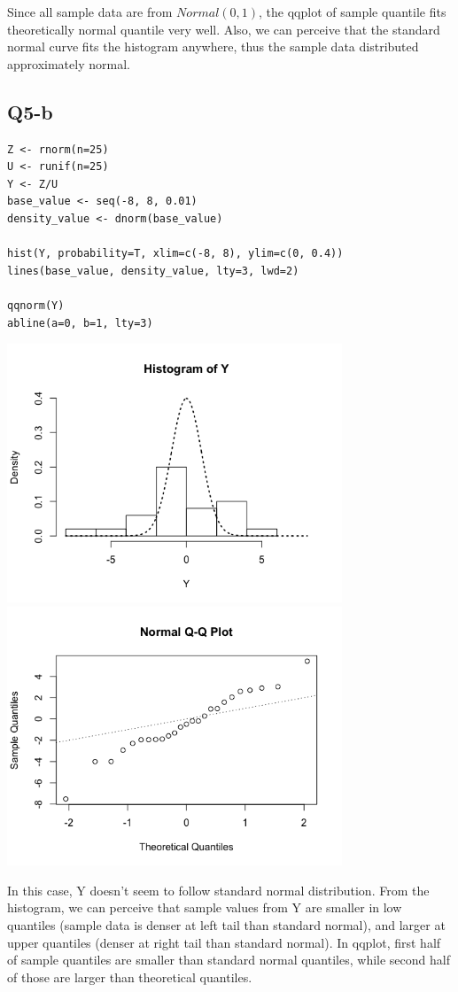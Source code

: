 \documentclass[11pt,letterpaper]{article}
\begin{document}
\noindent Since all sample data are from $Normal(0,1)$, the qqplot of sample quantile fits theoretically normal quantile very well. Also, we can perceive that the standard normal curve fits the histogram anywhere, thus the sample data distributed approximately normal. 

\newpage
\subsection*{Q5-b}
\begin{verbatim}
Z <- rnorm(n=25)
U <- runif(n=25)
Y <- Z/U
base_value <- seq(-8, 8, 0.01) 
density_value <- dnorm(base_value)

hist(Y, probability=T, xlim=c(-8, 8), ylim=c(0, 0.4))
lines(base_value, density_value, lty=3, lwd=2)

qqnorm(Y)
abline(a=0, b=1, lty=3)
\end{verbatim}

\hspace*{-1 in} 
\includegraphics[width=100mm]{q5-b-1.png}
\includegraphics[width=100mm]{q5-b-2.png}

\noindent In this case, Y doesn't seem to follow standard normal distribution. From the histogram, we can perceive that sample values from Y are smaller in low quantiles (sample data is denser at left tail than standard normal), and larger at upper quantiles (denser at right tail than standard normal). In qqplot, first half of sample quantiles are smaller than standard normal quantiles, while second half of those are larger than theoretical quantiles. 
\end{document}
